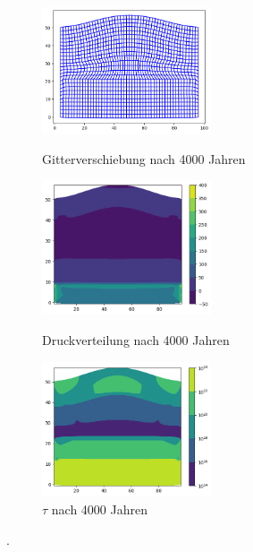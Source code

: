 \documentclass[12pt]{article}
\begin{document}
\begin{figure}[H]
	\begin{minipage}[hbt]{0.25\textwidth}
		\centering
		\includegraphics[width=5cm]{A2_Gitterverschiebung_4000.png}
		\caption{Gitterverschiebung nach 4000 Jahren}
		\label{Bild1}
	\end{minipage}
	\hfill
	\begin{minipage}[hbt]{0.25\textwidth}
		\centering
		\includegraphics[width=5cm]{A2_Druck_4000.png}
		\caption{Druckverteilung nach 4000 Jahren}
		\label{Bild2}
	\end{minipage}
	\hfill
	\begin{minipage}[hbt]{0.25\textwidth}
		\centering
		\includegraphics[width=5cm]{A2_tau2nd_4000.png}
		\caption{$\tau$ nach 4000 Jahren}
		\label{Bild2}
	\end{minipage}
\end{figure}
.
\end{document}
